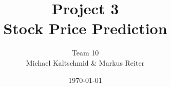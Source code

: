 \documentclass[a4paper]{DPSbachelor}
\title{Project 3 \\ Stock Price Prediction}
\author{Team 10 \\ Michael Kaltschmid \& Markus Reiter}
\date{\today}
\begin{document}
  \maketitle

	\abstract{}

  \tableofcontents
  \listoffigures
  \listoftables

  
  
  
  
  


\end{document}
